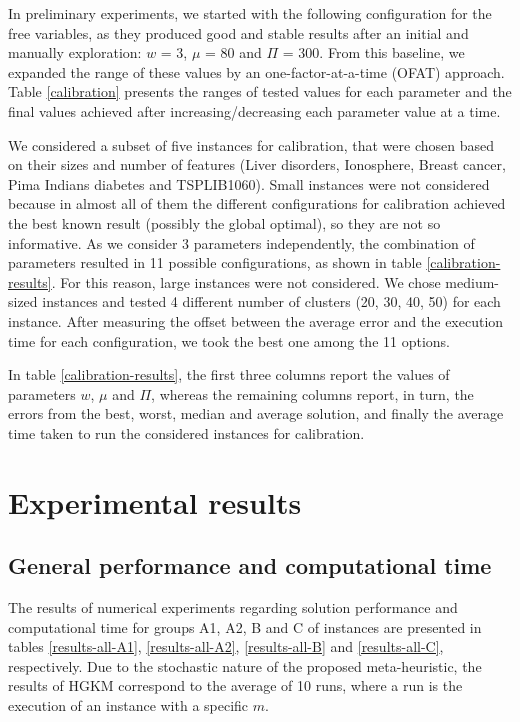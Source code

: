 In preliminary experiments, we started with the following configuration for the free variables, as they produced good and stable results after an initial and manually exploration: $w$ = 3, $\mu$ = 80 and $\Pi$ = 300. From this baseline, we expanded the range of these values by an one-factor-at-a-time (OFAT) approach. Table \ref{calibration} presents the ranges of tested values for each parameter and the final values achieved after increasing/decreasing each parameter value at a time.



We considered a subset of five instances for calibration, that were chosen based on their sizes and number of features (Liver disorders, Ionosphere, Breast cancer, Pima Indians diabetes and TSPLIB1060). Small instances were not considered because in almost all of them the different configurations for calibration achieved the best known result (possibly the global optimal), so they are not so informative. As we consider 3 parameters independently, the combination of parameters resulted in 11 possible configurations, as shown in table \ref{calibration-results}. For this reason, large instances were not considered.
We chose medium-sized instances and tested 4 different number of clusters (20, 30, 40, 50) for each instance. After measuring the offset between the average error and the execution time for each configuration, we took the best one among the 11 options.

In table \ref{calibration-results}, the first three columns report the values of parameters $w$, $\mu$ and $\Pi$, whereas the remaining columns report, in turn, the errors from the best, worst, median and average solution, and finally the average time taken to run the considered instances for calibration.



\section{Experimental results}
\label{sec:results}

\subsection{General performance and computational time}
\label{sec:performance}
The results of numerical experiments regarding solution performance and computational time for groups A1, A2, B and C of instances are presented in tables \ref{results-all-A1}, \ref{results-all-A2}, \ref{results-all-B} and \ref{results-all-C}, respectively. Due to the stochastic nature of the proposed meta-heuristic, the results of HGKM correspond to the average of 10 runs, where a run is the execution of an instance with a specific $m$. 

